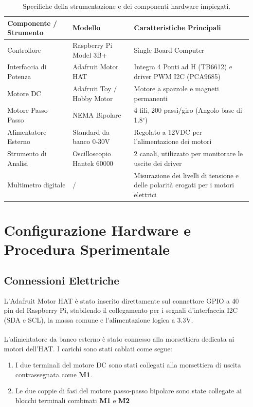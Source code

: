 \documentclass{article}
\begin{document}
\begin{table}[H]
\centering
\begin{tabularx}{\textwidth}{|X|X|X|}
\hline
\textbf{Componente / Strumento} & \textbf{Modello} & \textbf{Caratteristiche Principali} \\ \hline
Controllore & Raspberry Pi Model 3B+ & Single Board Computer \\ \hline
Interfaccia di Potenza & Adafruit Motor HAT & Integra 4 Ponti ad H (TB6612) e driver PWM I2C (PCA9685) \\ \hline
Motore DC & Adafruit Toy / Hobby Motor & Motore a spazzole e magneti permanenti \\ \hline
Motore Passo-Passo & NEMA Bipolare & 4 fili, 200 passi/giro (Angolo base di 1.8$^{\circ}$) \\ \hline
Alimentatore Esterno & Standard da banco 0-30V & Regolato a 12VDC per l'alimentazione dei motori \\ \hline
Strumento di Analisi & Oscilloscopio Hantek 60000 & 2 canali, utilizzato per monitorare le uscite dei driver \\ \hline
Multimetro digitale & / &Misurazione dei livelli di tensione e delle polarità erogati per i motori elettrici\\ \hline
\end{tabularx}
\caption{Specifiche della strumentazione e dei componenti hardware impiegati.}
\end{table}
\newpage

\section{Configurazione Hardware e Procedura Sperimentale}

\subsection{Connessioni Elettriche}
L'Adafruit Motor HAT è stato inserito direttamente sul connettore GPIO a 40 pin del Raspberry Pi, stabilendo il collegamento per i segnali d'interfaccia I2C (SDA e SCL), la massa comune e l'alimentazione logica a 3.3V. 
\\ \\
\noindent L'alimentatore da banco esterno è stato connesso alla morsettiera dedicata ai motori dell'HAT. I carichi sono stati cablati come segue:
\begin{enumerate}
\item I due terminali del motore DC sono stati collegati alla morsettiera di uscita contrassegnata come \textbf{M1}.
\item Le due coppie di fasi del motore passo-passo bipolare sono state collegate ai blocchi terminali combinati \textbf{M1} e \textbf{M2}
\end{enumerate}
\end{document}

